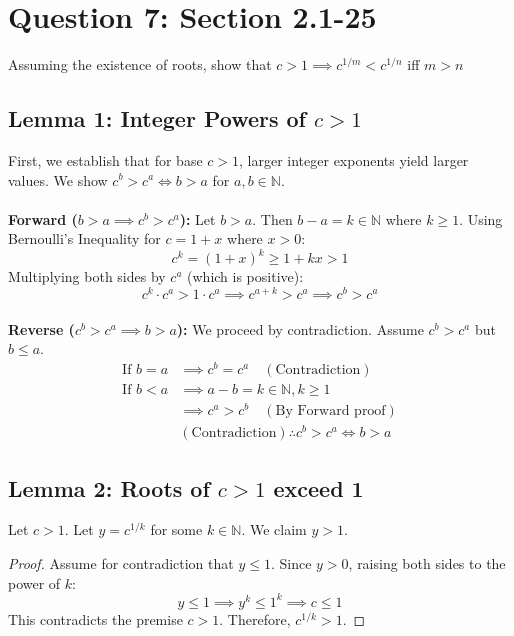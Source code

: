 \documentclass[11pt]{article}
\theoremstyle{plain}
\begin{document}
\section*{Question 7: Section 2.1-25}
\begin{center}
	Assuming the existence of roots, show that $c>1 \implies c^{1/m} < c^{1/n}$ iff $m>n$
\end{center}
\subsection*{Lemma 1: Integer Powers of $c > 1$}
First, we establish that for base $c > 1$, larger integer exponents yield larger values.
We show $c^b > c^a \iff b > a$ for $a,b \in \mathbb{N}$. \\ \\
\textbf{Forward ($b > a \implies c^b > c^a$):}
Let $b > a$. Then $b - a = k \in \mathbb{N}$ where $k \geq 1$.
Using Bernoulli's Inequality for $c = 1+x$ where $x > 0$:
\[ c^k = (1+x)^k \geq 1 + kx > 1 \]
Multiplying both sides by $c^a$ (which is positive):
\[ c^k \cdot c^a > 1 \cdot c^a \implies c^{a+k} > c^a \implies c^b > c^a \] \\
\textbf{Reverse ($c^b > c^a \implies b > a$):}
We proceed by contradiction. Assume $c^b > c^a$ but $b \leq a$.
\[
	\begin{aligned}
		\text{If } b = a & \implies c^b = c^a \quad (\text{Contradiction})        \\
		\text{If } b < a & \implies a - b = k \in \mathbb{N}, k \geq 1            \\
		                 & \implies c^a > c^b \quad (\text{By Forward proof})     \\
		                 & (\text{Contradiction}) \therefore c^b > c^a \iff b > a
	\end{aligned}
\]

\subsection*{Lemma 2: Roots of $c > 1$ exceed 1}
Let $c > 1$. Let $y = c^{1/k}$ for some $k \in \mathbb{N}$. We claim $y > 1$.
\begin{proof}
	Assume for contradiction that $y \leq 1$.
	Since $y > 0$, raising both sides to the power of $k$:
	\[ y \leq 1 \implies y^k \leq 1^k \implies c \leq 1 \]
	This contradicts the premise $c > 1$. Therefore, $c^{1/k} > 1$.
\end{proof}
\end{document}
